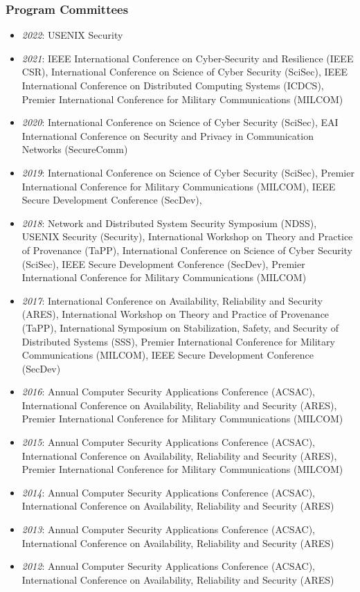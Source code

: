 \hypertarget{program-committees}{%
\subsubsection{Program Committees}\label{program-committees}}
\begin{itemize}
\tightlist
\item
  \emph{2022}: USENIX Security
\item
  \emph{2021}: IEEE International Conference on Cyber-Security and Resilience (IEEE CSR),
  International Conference on Science of Cyber Security (SciSec),
  IEEE International Conference on Distributed Computing Systems (ICDCS),
  Premier International Conference for Military Communications (MILCOM)
\item
  \emph{2020}: International Conference on Science of Cyber Security (SciSec),
  EAI International Conference on Security and Privacy in Communication Networks (SecureComm)
\item
  \emph{2019}: International Conference on Science of Cyber Security (SciSec),
  Premier International Conference for Military Communications (MILCOM),
  IEEE Secure Development Conference (SecDev),
\item
  \emph{2018}: Network and Distributed System Security Symposium (NDSS),
  USENIX Security (Security),
  International Workshop on Theory and Practice of Provenance (TaPP),
  International Conference on Science of Cyber Security (SciSec),
  IEEE Secure Development Conference (SecDev),
  Premier International Conference for Military Communications (MILCOM)
\item
  \emph{2017}: International Conference on Availability, Reliability and Security (ARES),
  International Workshop on Theory and Practice of Provenance (TaPP),
  International Symposium on Stabilization, Safety, and Security of Distributed Systems (SSS),
  Premier International Conference for Military Communications (MILCOM),
  IEEE Secure Development Conference (SecDev)
\item
  \emph{2016}: Annual Computer Security Applications Conference (ACSAC),
  International Conference on Availability, Reliability and Security (ARES),
  Premier International Conference for Military Communications (MILCOM)
\item
  \emph{2015}: Annual Computer Security Applications Conference (ACSAC),
  International Conference on Availability, Reliability and Security (ARES),
  Premier International Conference for Military Communications (MILCOM)
\item
  \emph{2014}: Annual Computer Security Applications Conference (ACSAC),
  International Conference on Availability, Reliability and Security (ARES)
\item
  \emph{2013}: Annual Computer Security Applications Conference (ACSAC),
  International Conference on Availability, Reliability and Security (ARES)
\item
  \emph{2012}: Annual Computer Security Applications Conference (ACSAC),
  International Conference on Availability, Reliability and Security (ARES)
\end{itemize}

